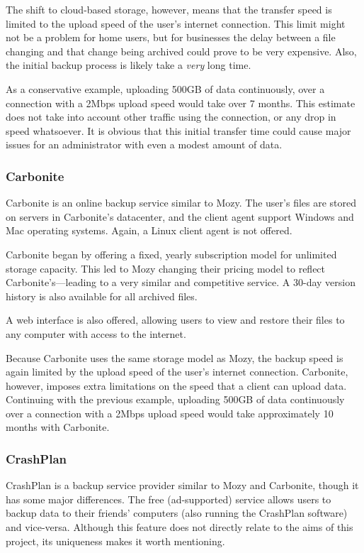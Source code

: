 The shift to cloud-based storage, however, means that the transfer speed is
limited to the upload speed of the user's internet connection. This limit might
not be a problem for home users, but for businesses the delay between a file
changing and that change being archived could prove to be very expensive. Also,
the initial backup process is likely take a \emph{very} long time.

As a conservative example, uploading 500GB of data continuously, over
a connection with a 2Mbps upload speed would take over 7 months. This estimate
does not take into account other traffic using the connection, or any drop in
speed whatsoever. It is obvious that this initial transfer time could cause
major issues for an administrator with even a modest amount of data.

\subsubsection{Carbonite}

Carbonite is an online backup service similar to Mozy. The user's files are
stored on servers in Carbonite's datacenter, and the client agent support
Windows and Mac operating systems. Again, a Linux client agent is not
offered\cite{Carbonite}.

Carbonite began by offering a fixed, yearly subscription model for unlimited
storage capacity. This led to Mozy changing their pricing model to reflect
Carbonite's---leading to a very similar and competitive
service\cite{Carbonite-report}. A 30-day version history is also available for
all archived files\cite{Carbonite}.

A web interface is also offered, allowing users to view and restore their files
to any computer with access to the internet\cite{Carbonite}.

Because Carbonite uses the same storage model as Mozy, the backup speed is
again limited by the upload speed of the user's internet connection. Carbonite,
however, imposes extra limitations on the speed that a client can upload
data\cite{Carbonite-limits}. Continuing with the previous example, uploading
500GB of data continuously over a connection with a 2Mbps upload speed would
take approximately 10 months with Carbonite.


\subsubsection{CrashPlan}

CrashPlan is a backup service provider similar to Mozy and Carbonite, though it
has some major differences. The free (ad-supported) service allows users to
backup data to their friends' computers (also running the CrashPlan software)
and vice-versa. Although this feature does not directly relate to the aims of
this project, its uniqueness makes it worth mentioning.

